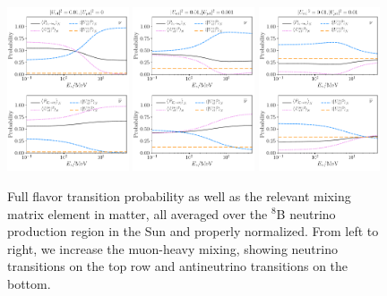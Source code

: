 \documentclass[
reprint,
superscriptaddress,
showpacs,
preprintnumbers,
nofootinbib,
nobibnotes,
amsmath,
amssymb, 
aps,
prd,
floatfix
]{revtex4-1}
\begin{document}
\begin{figure}[t]
    \centering
    \includegraphics[width=0.32\textwidth]{Psolar_0.pdf}
    \includegraphics[width=0.32\textwidth]{Psolar_1.pdf}
    \includegraphics[width=0.32\textwidth]{Psolar_10.pdf}
    \caption{Full flavor transition probability as well as the relevant mixing matrix element in matter, all averaged over the $^8$B neutrino production region in the Sun and properly normalized. From left to right, we increase the muon-heavy mixing, showing neutrino transitions on the top row and antineutrino transitions on the bottom.}
    \label{fig:probability}
\end{figure}
\end{document}
